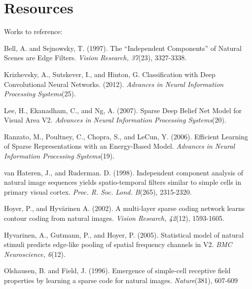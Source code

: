 \documentclass[12pt]{article}
\begin{document}
\section*{Resources}
Works to reference:
\\
\singlespace
\leftskip 0.5in
\parindent -0.5in


Bell, A. and Sejnowsky, T. (1997). The ``Independent Components'' of Natural Scenes are Edge Filters. \emph{Vision Research, 37}(23), 3327-3338.

Krizhevsky, A., Sutskever, I., and Hinton, G. Classification with Deep Convolutional Neural Networks. (2012). \emph{Advances in Neural Information Processing Systems}(25).

Lee, H., Ekanadham, C., and Ng, A. (2007). Sparse Deep Belief Net Model for Visual Area V2. \emph{Advances in Neural Information Processing Systems}(20).

Ranzato, M., Poultney, C., Chopra, S., and LeCun, Y. (2006). Efficient Learning of Sparse Representations with an Energy-Based Model. \emph{Advances in Neural Information Processing Systems}(19).

van Hateren, J., and Ruderman. D. (1998). Independent component analysis of natural image sequences yields spatio-temporal filters similar to simple cells in primary visual cortex. \emph{Proc. R. Soc. Lond. B}(265), 2315-2320.

Hoyer, P., and Hyvärinen A. (2002). A multi-layer sparse coding network
learns contour coding from natural images. \emph{Vision Research, 42}(12), 1593-1605.

Hyvarinen, A., Gutmann, P., and Hoyer, P. (2005). Statistical model of natural stimuli predicts edge-like pooling of spatial frequency channels in V2. \emph{BMC Neuroscience, 6}(12).

Olshausen, B. and Field, J. (1996). Emergence of simple-cell receptive field properties by learning a sparse code for natural images. \emph{Nature}(381), 607-609
\end{document}
